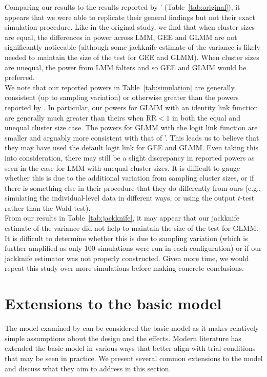 \documentclass[10pt]{article}
\begin{document}
Comparing our results to the results reported by \citeauthor{Hussey:2007}' (Table~\ref{tab:original}), it appears that we were able to replicate their general findings but not their exact simulation procedure. Like in the original study, we find that when cluster sizes are equal, the differences in power across LMM, GEE and GLMM are not significantly noticeable (although some jackknife estimate of the variance is likely needed to maintain the size of the test for GEE and GLMM). When cluster sizes are unequal, the power from LMM falters and so GEE and GLMM would be preferred.
\\

We note that our reported powers in Table~\ref{tab:simulation} are generally consistent (up to sampling variation) or otherwise greater than the powers reported by \citeauthor{Hussey:2007}. In particular, our powers for GLMM with an identity link function are generally much greater than theirs when $\text{RR}<1$ in both the equal and unequal cluster size case. The powers for GLMM with the logit link function are smaller and arguably more consistent with that of \citeauthor{Hussey:2007}'. This leads us to believe that they may have used the default logit link for GEE and GLMM. Even taking this into consideration, there may still be a slight discrepancy in reported powers as seen in the case for LMM with unequal cluster sizes. It is difficult to gauge whether this is due to the additional variation from sampling cluster sizes, or if there is something else in their procedure that they do differently from ours (e.g., simulating the individual-level data in different ways, or using the output $t$-test rather than the Wald test).
\\

From our results in Table~\ref{tab:jackknife}, it may appear that our jackknife estimate of the variance did not help to maintain the size of the test for GLMM. It is difficult to determine whether this is due to sampling variation (which is further amplified as only 100 simulations were run in each configuration) or if our jackknife estimator was not properly constructed. Given more time, we would repeat this study over more simulations before making concrete conclusions.


\section{Extensions to the basic model} \label{sec:extension}

The model examined by \textcite{Hussey:2007} can be considered the basic model as it makes relatively simple assumptions about the design and the effects. Modern literature has extended the basic model in various ways that better align with trial conditions that may be seen in practice. We present several common extensions to the model and discuss what they aim to address in this section.
\end{document}
